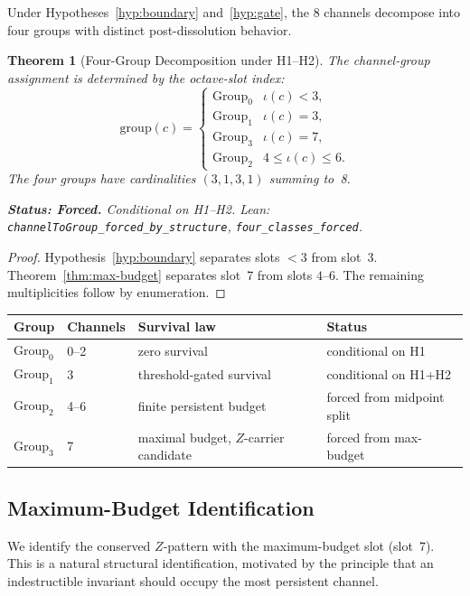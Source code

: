 \documentclass[11pt,a4paper]{article}
\newtheorem{theorem}{Theorem}[section]
\theoremstyle{definition}
\newcommand{\Zp}{Z}
\newcommand{\code}[1]{\texttt{\small #1}}
\newcommand{\forced}[1]{\noindent\textbf{Status: Forced.} #1}
\begin{document}
Under Hypotheses~\ref{hyp:boundary} and~\ref{hyp:gate}, the 8 channels
decompose into four groups with distinct post-dissolution behavior.

\begin{theorem}[Four-Group Decomposition under H1--H2]
\label{thm:tetrachotomy}
The channel-group assignment is determined by the octave-slot index:
\[
  \mathrm{group}(c) =
  \begin{cases}
    \mathrm{Group}_0 & \iota(c) < 3,\\
    \mathrm{Group}_1 & \iota(c) = 3,\\
    \mathrm{Group}_3 & \iota(c) = 7,\\
    \mathrm{Group}_2 & 4 \le \iota(c) \le 6.
  \end{cases}
\]
The four groups have cardinalities $(3,1,3,1)$ summing to~8.

\forced{Conditional on H1--H2. Lean:
\code{channelToGroup\_forced\_by\_structure},
\code{four\_classes\_forced}.}
\end{theorem}

\begin{proof}
Hypothesis~\ref{hyp:boundary} separates slots $<3$ from slot~3.
Theorem~\ref{thm:max-budget} separates slot~7 from slots $4$--$6$.
The remaining multiplicities follow by enumeration.
\end{proof}

\begin{center}
\small
\begin{tabular}{llll}
\toprule
\textbf{Group} & \textbf{Channels} & \textbf{Survival law} & \textbf{Status} \\
\midrule
$\mathrm{Group}_0$ & 0--2 & zero survival & conditional on H1 \\
$\mathrm{Group}_1$ & 3 & threshold-gated survival & conditional on H1+H2 \\
$\mathrm{Group}_2$ & 4--6 & finite persistent budget & forced from midpoint split \\
$\mathrm{Group}_3$ & 7 & maximal budget, $\Zp$-carrier candidate & forced from max-budget \\
\bottomrule
\end{tabular}
\end{center}

\subsection{Maximum-Budget Identification}

We identify the conserved $\Zp$-pattern with the maximum-budget slot
(slot~7). This is a natural structural identification, motivated by the
principle that an indestructible invariant should occupy the most
persistent channel.
\end{document}
